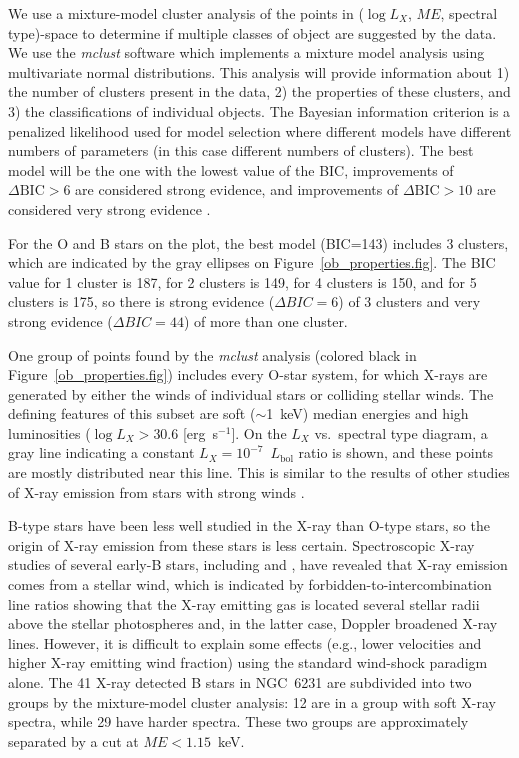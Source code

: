 \documentclass[twocolumn,tighten]{aastex61}
\begin{document}
We use a mixture-model cluster analysis of the points in ($\log L_X$, $ME$, spectral type)-space to determine if multiple classes of object are suggested by the data. We use the {\it mclust} software  \citep{mclust02,mclust12} which implements a mixture model analysis using multivariate normal distributions. This analysis will provide information about 1) the number of clusters present in the data, 2) the properties of these clusters, and 3) the classifications of individual objects. 
The Bayesian information criterion \citep[BIC;][]{schwarz1978estimating} is a penalized likelihood used for model selection where different models have different numbers of parameters (in this case different numbers of clusters). The best model will be the one with the lowest value of the BIC, improvements of $\Delta\mathrm{BIC}>6$ are considered strong evidence, and improvements of $\Delta\mathrm{BIC}>10$ are considered very strong evidence \citep{jeffreys1961theory,KassRaftery95}. 

For the O and B stars on the plot, the best model (BIC=143) includes 3 clusters, which are indicated by the gray ellipses on Figure~\ref{ob_properties.fig}. The BIC value for 1 cluster is 187, for 2 clusters is 149, for 4 clusters is 150, and for 5 clusters is 175, so there is strong evidence ($\Delta BIC=6$) of 3 clusters and very strong evidence ($\Delta BIC=44$) of more than one cluster.

One group of points found by the {\it mclust} analysis (colored black in Figure~\ref{ob_properties.fig}) includes every O-star system, for which X-rays are generated by either the winds of individual stars or colliding stellar winds. The defining features of this subset are soft ($\sim$1~keV) median energies and high luminosities ($\log L_X>30.6$ [erg~s$^{-1}$]. On the $L_X$ vs.\ spectral type diagram, a gray line indicating a constant $L_X=10^{-7}$~$L_\mathrm{bol}$ ratio is shown, and these points are mostly distributed near this line. This is similar to the results of other studies of X-ray emission from stars with strong winds \citep[e.g.,][their Figure~9]{2005ApJS..160..557S}. 

B-type stars have been less well studied in the X-ray than O-type stars, so the origin of X-ray emission from these stars is less certain. Spectroscopic X-ray studies of several early-B stars, including  \citep[B0.2V;][]{2003ApJ...586..495C} and  \citep[B0.5III+B2V;][]{2008MNRAS.386.1855C}, have revealed that X-ray emission comes from a stellar wind, which is indicated by forbidden-to-intercombination line ratios showing that the X-ray emitting gas is located several stellar radii above the stellar photospheres and, in the latter case, Doppler broadened X-ray lines. However, it is difficult to explain some effects (e.g., lower velocities and higher X-ray emitting wind fraction) using the standard wind-shock paradigm alone. The 41 X-ray detected B stars in NGC~6231 are subdivided into two groups by the mixture-model cluster analysis: 12 are in a group with soft X-ray spectra, while 29 have harder spectra. These two groups are approximately separated by a cut at $ME<1.15$~keV.  
\end{document}
